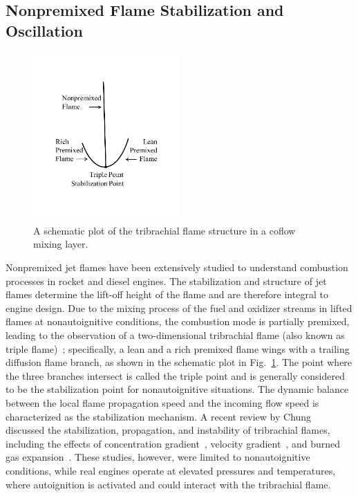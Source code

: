 \subsection{Nonpremixed Flame Stabilization and Oscillation}\label{sec:intro-stabilization}

\begin{figure}[t]
  \centering
  \scriptsize
  \includegraphics[trim=20mm 24mm 20mm 20mm, clip=true, width=0.5\textwidth]{ch-intro/triple_flame.png}
  \normalsize
  \caption{A schematic plot of the tribrachial flame structure in a coflow mixing layer.}
  \label{fig:triple_flame}
\end{figure}

Nonpremixed jet flames have been extensively studied to understand combustion processes in rocket and diesel engines.  The stabilization and structure of jet flames determine the lift-off height of the flame and are therefore integral to engine design.  Due to the mixing process of the fuel and oxidizer streams in lifted flames at nonautoignitive conditions, the combustion mode is partially premixed, leading to the observation of a two-dimensional tribrachial flame (also known as triple flame)~\cite{buckmaster02}; specifically, a lean and a rich premixed flame wings with a trailing diffusion flame branch, as shown in the schematic plot in Fig.~\ref{fig:triple_flame}.  The point where the three branches intersect is called the triple point and is generally considered to be the stabilization point for nonautoignitive situations. The dynamic balance between the local flame propagation speed and the incoming flow speed is characterized as the stabilization mechanism.  A recent review by Chung~\cite{chung07} discussed the stabilization, propagation, and instability of tribrachial flames, including the effects of concentration gradient~\cite{dold89,hartley91,ghosal00}, velocity gradient~\cite{kim07}, and burned gas expansion~\cite{ruetsch95,lee97,plessing98,kioni99}.  These studies, however, were limited to nonautoignitive conditions, while real engines operate at elevated pressures and temperatures, where autoignition is activated and could interact with the tribrachial flame.

